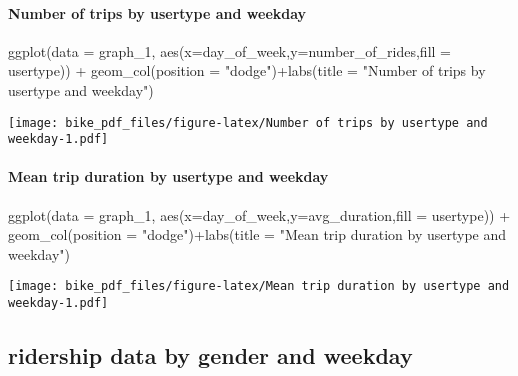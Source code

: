\documentclass[
]{article}
\newenvironment{Shaded}{\begin{snugshade}}{\end{snugshade}}
\newcommand{\AttributeTok}[1]{\textcolor[rgb]{0.77,0.63,0.00}{#1}}
\newcommand{\FunctionTok}[1]{\textcolor[rgb]{0.00,0.00,0.00}{#1}}
\newcommand{\NormalTok}[1]{#1}
\newcommand{\SpecialCharTok}[1]{\textcolor[rgb]{0.00,0.00,0.00}{#1}}
\newcommand{\StringTok}[1]{\textcolor[rgb]{0.31,0.60,0.02}{#1}}
\begin{document}
\hypertarget{number-of-trips-by-usertype-and-weekday}{%
\paragraph{Number of trips by usertype and
weekday}\label{number-of-trips-by-usertype-and-weekday}}

\begin{Shaded}
\begin{Highlighting}[]
\FunctionTok{ggplot}\NormalTok{(}\AttributeTok{data =}\NormalTok{ graph\_1, }\FunctionTok{aes}\NormalTok{(}\AttributeTok{x=}\NormalTok{day\_of\_week,}\AttributeTok{y=}\NormalTok{number\_of\_rides,}\AttributeTok{fill =}\NormalTok{ usertype)) }\SpecialCharTok{+}
  \FunctionTok{geom\_col}\NormalTok{(}\AttributeTok{position =} \StringTok{"dodge"}\NormalTok{)}\SpecialCharTok{+}\FunctionTok{labs}\NormalTok{(}\AttributeTok{title =} \StringTok{"Number of trips by usertype and weekday"}\NormalTok{)}
\end{Highlighting}
\end{Shaded}

\texttt{[image: bike\_pdf\_files/figure-latex/Number of trips by usertype and weekday-1.pdf]}

\hypertarget{mean-trip-duration-by-usertype-and-weekday}{%
\paragraph{Mean trip duration by usertype and
weekday}\label{mean-trip-duration-by-usertype-and-weekday}}

\begin{Shaded}
\begin{Highlighting}[]
\FunctionTok{ggplot}\NormalTok{(}\AttributeTok{data =}\NormalTok{ graph\_1, }\FunctionTok{aes}\NormalTok{(}\AttributeTok{x=}\NormalTok{day\_of\_week,}\AttributeTok{y=}\NormalTok{avg\_duration,}\AttributeTok{fill =}\NormalTok{ usertype)) }\SpecialCharTok{+}
  \FunctionTok{geom\_col}\NormalTok{(}\AttributeTok{position =} \StringTok{"dodge"}\NormalTok{)}\SpecialCharTok{+}\FunctionTok{labs}\NormalTok{(}\AttributeTok{title =} \StringTok{"Mean trip duration by usertype and weekday"}\NormalTok{)}
\end{Highlighting}
\end{Shaded}

\texttt{[image: bike\_pdf\_files/figure-latex/Mean trip duration by usertype and weekday-1.pdf]}

\hypertarget{ridership-data-by-gender-and-weekday}{%
\subsection{ridership data by gender and
weekday}\label{ridership-data-by-gender-and-weekday}}
\end{document}
